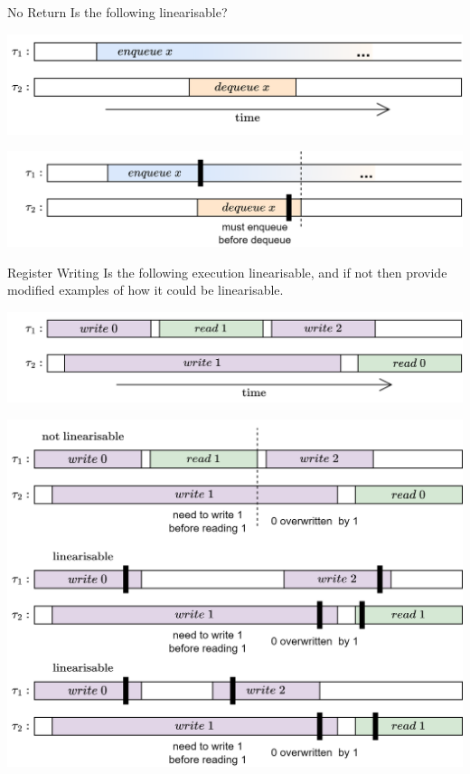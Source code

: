 \begin{examplebox}{No Return}
	Is the following linearisable?
	\begin{center}
		\includegraphics[width=.9\textwidth]{concurrent_objects/images/example_linearisation_no_return.drawio.png}
	\end{center}
	\tcblower
	\begin{center}
		\includegraphics[width=.9\textwidth]{concurrent_objects/images/example_linearisation_no_return_answer.drawio.png}
	\end{center}
\end{examplebox}

\begin{examplebox}{Register Writing}
	Is the following execution linearisable, and if not then provide modified examples of how it could be linearisable.
	\begin{center}
		\includegraphics[width=.9\textwidth]{concurrent_objects/images/example_registers_linearisable.drawio.png}
	\end{center}
	\tcblower
	\begin{center}
		\includegraphics[width=.9\textwidth]{concurrent_objects/images/example_registers_linearisable_answer.drawio.png}
	\end{center}
\end{examplebox}

